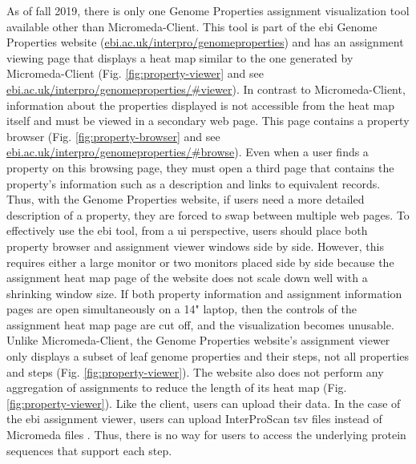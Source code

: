 As of fall 2019, there is only one Genome Properties assignment visualization 
tool available other than Micromeda-Client. This tool is part of the \gls{ebi} 
Genome Properties website \cite{richardson2018genome} 
(\href{http://www.ebi.ac.uk/interpro/genomeproperties}{ebi.ac.uk/interpro/genomeproperties}) 
and has an assignment viewing page that displays a heat map similar to the one 
generated by Micromeda-Client \cite{richardson2018genome} (Fig. 
\ref{fig:property-viewer} and see 
\href{http://www.ebi.ac.uk/interpro/genomeproperties/#viewer}{ebi.ac.uk/interpro/genomeproperties/\#viewer}). 
In contrast to Micromeda-Client, information about the properties displayed is 
not accessible from the heat map itself and must be viewed in a secondary web 
page. This page contains a property browser (Fig. \ref{fig:property-browser} and 
see 
\href{http://www.ebi.ac.uk/interpro/genomeproperties/#browse}{ebi.ac.uk/interpro/genomeproperties/\#browse}). 
Even when a user finds a property on this browsing page, they must open a third 
page that contains the property's information such as a description and links to 
equivalent records. Thus, with the Genome Properties website, if users need a 
more detailed description of a property, they are forced to swap between 
multiple web pages. To effectively use the \gls{ebi} tool, from a \gls{ui} 
perspective, users should place both property browser and assignment viewer 
windows side by side. However, this requires either a large monitor or two 
monitors placed side by side because the assignment heat map page of the website 
does not scale down well with a shrinking window size. If both property 
information and assignment information pages are open simultaneously on a 14" 
laptop, then the controls of the assignment heat map page are cut off, and the 
visualization becomes unusable. Unlike Micromeda-Client, the Genome Properties 
website's assignment viewer only displays a subset of leaf genome properties and 
their steps, not all properties and steps (Fig. \ref{fig:property-viewer}). The 
website also does not perform any aggregation of assignments to reduce the 
length of its heat map (Fig. \ref{fig:property-viewer}). Like the client, users 
can upload their data. In the case of the \gls{ebi} assignment viewer, users can 
upload InterProScan \gls{tsv} files instead of Micromeda files 
\cite{richardson2018genome}. Thus, there is no way for users to access the 
underlying protein sequences that support each step.

